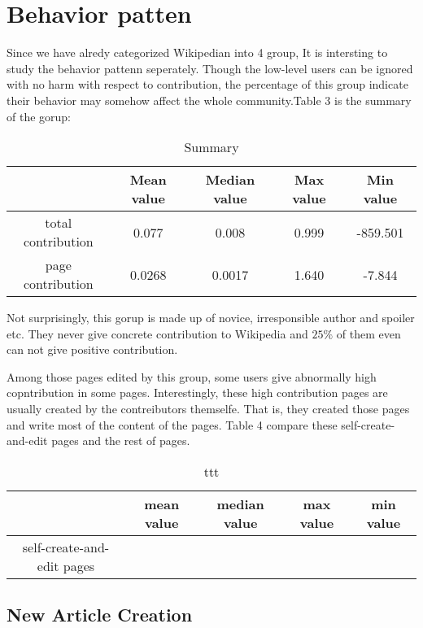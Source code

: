 \documentclass{elsarticle}
\begin{document}
\section{Behavior patten}
\label{sec:behavior-patten}

Since we have alredy categorized Wikipedian into 4 group, It is
intersting to study the behavior pattenn seperately. Though the
low-level users can be ignored with no harm with respect to
contribution, the percentage of this group indicate their behavior may
somehow affect the whole community.Table 3 is the summary of the
gorup:
\begin{table}
  \centering
  \caption{Summary}
  \begin{tabular}[h]{|c|c|c|c|c|}
    \hline
   & Mean value&Median value&Max value&Min value \\\hline
   total contribution& 0.077&0.008&0.999&-859.501 \\\hline
   page contribution& 0.0268&0.0017&1.640&-7.844 \\\hline
  \end{tabular}

\end{table}
Not surprisingly, this gorup is made up of novice, irresponsible
author and spoiler etc. They never give concrete contribution to
Wikipedia and $25\%$ of them even can not  give positive contribution.



Among those pages edited by this group, some users give abnormally
high copntribution in some pages. Interestingly, these high
contribution pages are usually created by the contreibutors
themselfe. That is, they created those pages and write most of the
content of the pages. Table 4 compare these self-create-and-edit pages
and the rest of pages.
\begin{table}[h]
  \centering
  \begin{tabular}{|c|c|c|c|c|}
    \hline
    &mean value&median value&max value&min value \\\hline
    self-create-and-edit pages&
  \end{tabular}
  \caption{ttt}
\end{table}
\subsection{New Article Creation}
\label{sec:new-article-creation}


\end{document}
